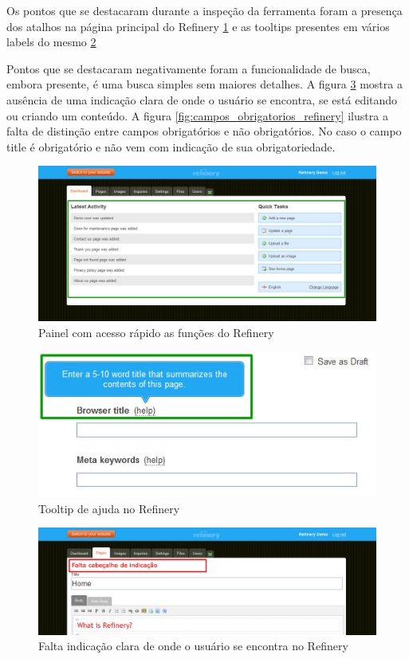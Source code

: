 Os pontos que se destacaram durante a inspeção da ferramenta foram a presença dos atalhos na página principal do Refinery \ref{fig:dashboard_refinery} e as tooltips presentes em vários labels do mesmo \ref{fig:tooltip_refinery} 

Pontos que se destacaram negativamente foram a funcionalidade de busca, embora presente, é uma busca simples sem maiores detalhes. A figura \ref{fig:cabecalho_refinery} mostra a ausência de uma indicação clara de onde o usuário se encontra, se está editando ou criando um conteúdo. A figura \ref{fig:campos_obrigatorios_refinery} ilustra a falta de distinção entre campos obrigatórios e não obrigatórios. No caso o campo title é obrigatório e não vem com indicação de sua obrigatoriedade.

\begin{figure}[here]
\includegraphics[width=150mm]{images/refinery_ponto_dashboard.jpg}
\caption{Painel com acesso rápido as funções do Refinery}
\label{fig:dashboard_refinery}
\end{figure}

\begin{figure}[here]
\includegraphics[width=150mm]{images/refinery_ponto_tooltip.jpg}
\caption{Tooltip de ajuda no Refinery}
\label{fig:tooltip_refinery}
\end{figure}


\begin{figure}[here]
\includegraphics[width=150mm]{images/refinery_erro_cabecalho.jpg}
\caption{Falta indicação clara de onde o usuário se encontra no Refinery }
\label{fig:cabecalho_refinery}
\end{figure}


